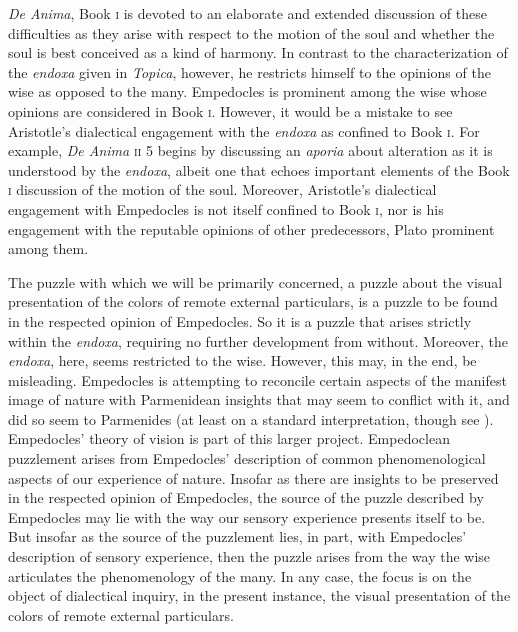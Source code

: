 \emph{De Anima}, Book \textsc{i} is devoted to an elaborate and extended discussion of these difficulties as they arise with respect to the motion of the soul and whether the soul is best conceived as a kind of harmony. In contrast to the characterization of the \emph{endoxa} given in \emph{Topica}, however, he restricts himself to the opinions of the wise as opposed to the many. Empedocles is prominent among the wise whose opinions are considered in Book \textsc{i}. However, it would be a mistake to see Aristotle's dialectical engagement with the \emph{endoxa} as confined to Book \textsc{i}. For example, \emph{De Anima} \textsc{ii} 5 begins by discussing an \emph{aporia} about alteration as it is understood by the \emph{endoxa}, albeit one that echoes important elements of the Book \textsc{i} discussion of the motion of the soul. Moreover, Aristotle's dialectical engagement with Empedocles is not itself confined to Book \textsc{i}, nor is his engagement with the reputable opinions of other predecessors, Plato prominent among them. 

The puzzle with which we will be primarily concerned, a puzzle about the visual presentation of the colors of remote external particulars, is a puzzle to be found in the respected opinion of Empedocles. So it is a puzzle that arises strictly within the \emph{endoxa}, requiring no further development from without. Moreover, the \emph{endoxa}, here, seems restricted to the wise. However, this may, in the end, be misleading. Empedocles is attempting to reconcile certain aspects of the manifest image of nature with Parmenidean insights that may seem to conflict with it, and did so seem to Parmenides (at least on a standard interpretation, though see \citealt{Palmer:2009qf}). Empedocles' theory of vision is part of this larger project. Empedoclean puzzlement arises from Empedocles' description of common phenomenological aspects of our experience of nature. Insofar as there are insights to be preserved in the respected opinion of Empedocles, the source of the puzzle described by Empedocles may lie with the way our sensory experience presents itself to be. But insofar as the source of the puzzlement lies, in part, with Empedocles' description of sensory experience, then the puzzle arises from the way the wise articulates the phenomenology of the many. In any case, the focus is on the object of dialectical inquiry, in the present instance, the visual presentation of the colors of remote external particulars.


